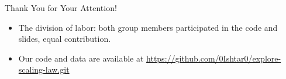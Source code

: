 \documentclass[aspectratio=169]{beamer}
\begin{document}
    \begin{frame}
        \begin{center}
            \Huge Thank You for Your Attention!
        \end{center}

        \begin{itemize}
            \item The division of labor: both group members participated in the code and slides, equal contribution.
            \item Our code and data are available at
            \url{https://github.com/0Ishtar0/explore-scaling-law.git}
        \end{itemize}
    \end{frame}
\end{document}
